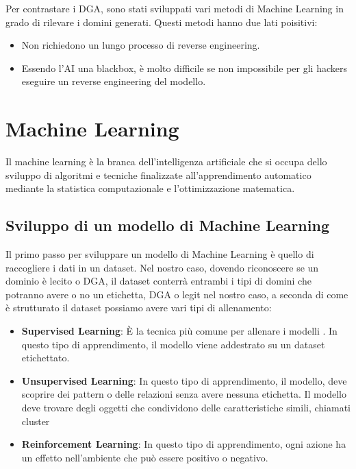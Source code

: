 \documentclass[12pt,a4paper,openright,twoside]{book}
\begin{document}
Per contrastare i DGA, sono stati sviluppati
vari metodi di Machine Learning in grado di rilevare i domini generati.
Questi metodi hanno due lati poisitivi:
\begin{itemize}
    \item Non richiedono un lungo processo di reverse engineering.
    \item Essendo l'AI una blackbox, è molto difficile se non impossibile
    per gli hackers eseguire un reverse engineering del modello.
\end{itemize}

\section{Machine Learning}
Il machine learning è la branca dell'intelligenza artificiale che si occupa dello sviluppo
di algoritmi e tecniche finalizzate all'apprendimento automatico mediante
la statistica computazionale e l'ottimizzazione matematica.\cite{treccani2024}

\subsection{Sviluppo di un modello di Machine Learning}
Il primo passo per sviluppare un modello di Machine Learning è quello di
raccogliere i dati in un dataset. Nel nostro caso, dovendo riconoscere se un dominio
è lecito o DGA, il dataset conterrà
entrambi i tipi di domini che potranno avere o no un etichetta, DGA o legit nel nostro caso,
a seconda di come è strutturato il dataset possiamo avere vari tipi di allenamento:

\begin{itemize}
    \item \textbf{Supervised Learning}: È la tecnica più comune
    per allenare i modelli \cite{ayodele2010types}. In questo tipo di apprendimento,
    il modello viene addestrato su un dataset etichettato.
    \item \textbf{Unsupervised Learning}: In questo tipo di apprendimento,
    il modello, deve scoprire dei pattern o delle relazioni
    senza avere nessuna etichetta. Il modello deve trovare
    degli oggetti che condividono delle caratteristiche simili, chiamati
    cluster
    \item \textbf{Reinforcement Learning}: In questo tipo di apprendimento,
    ogni azione ha un effetto nell'ambiente che può essere positivo
    o negativo.
\end{itemize}
\end{document}

